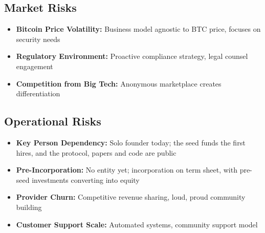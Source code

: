 \subsection{Market Risks}
\begin{itemize}
  \item \textbf{Bitcoin Price Volatility:} Business model agnostic to BTC price, focuses on security needs
  \item \textbf{Regulatory Environment:} Proactive compliance strategy, legal counsel engagement
  \item \textbf{Competition from Big Tech:} Anonymous marketplace creates differentiation
\end{itemize}

\subsection{Operational Risks}
\begin{itemize}
  \item \textbf{Key Person Dependency:} Solo founder today; the seed funds the first hires, and the protocol, papers and code are public
  \item \textbf{Pre-Incorporation:} No entity yet; incorporation on term sheet, with pre-seed investments converting into equity
  \item \textbf{Provider Churn:} Competitive revenue sharing, loud, proud community building
  \item \textbf{Customer Support Scale:} Automated systems, community support model
\end{itemize}